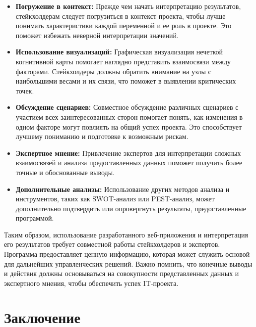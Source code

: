 \documentclass{article}
\begin{document}
    \begin{itemize}
        \item \textbf{Погружение в контекст:}
        Прежде чем начать интерпретацию результатов, стейкхолдерам следует погрузиться в контекст проекта, чтобы лучше понимать характеристики каждой переменной и ее роль в проекте. Это поможет избежать неверной интерпретации значений.
        \item \textbf{Использование визуализаций:}
        Графическая визуализация нечеткой когнитивной карты помогает наглядно представить взаимосвязи между факторами. Стейкхолдеры должны обратить внимание на узлы с наибольшими весами и их связи, что поможет в выявлении критических точек.
        \item \textbf{Обсуждение сценариев:}
        Совместное обсуждение различных сценариев с участием всех заинтересованных сторон помогает понять, как изменения в одном факторе могут повлиять на общий успех проекта. Это способствует лучшему пониманию и подготовке к возможным рискам.
        \item \textbf{Экспертное мнение:}
        Привлечение экспертов для интерпретации сложных взаимосвязей и анализа предоставленных данных поможет получить более точные и обоснованные выводы.
        \item \textbf{Дополнительные анализы:}
        Использование других методов анализа и инструментов, таких как SWOT-анализ или PEST-анализ, может дополнительно подтвердить или опровергнуть результаты, предоставленные программой.
    \end{itemize}

    Таким образом, использование разработанного веб-приложения и интерпретация его результатов требует совместной работы стейкхолдеров и экспертов. Программа предоставляет ценную информацию, которая может служить основой для дальнейших управленческих решений. Важно помнить, что конечные выводы и действия должны основываться на совокупности представленных данных и экспертного мнения, чтобы обеспечить успех IT-проекта.
    \section{Заключение}
\end{document}
